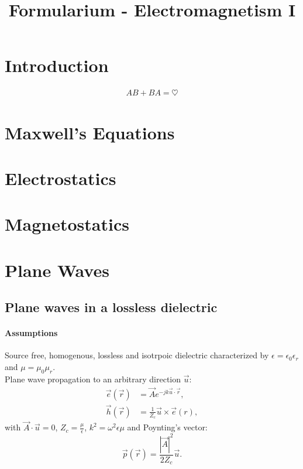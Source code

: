 \documentclass[a4paper, 10pt]{article}
\title{Formularium - Electromagnetism I}
\author{}
\date{}
\begin{document}
    
    \maketitle

    \section{Introduction}
    \begin{align}
        AB + BA = \heartsuit
    \end{align}
    \section{Maxwell's Equations}
    \section{Electrostatics}
    \section{Magnetostatics}
    \section{Plane Waves}
    \subsection{Plane waves in a lossless dielectric}
    \paragraph{Assumptions}
    Source free, homogenous, lossless and isotrpoic dielectric characterized by $\epsilon=\epsilon_0\epsilon_r$ and $\mu=\mu_0\mu_r$.\\
    Plane wave propagation to an arbitrary direction $\vec{u}$:
    \begin{align}
        \vec{e}(\vec{r}) & = \vec{A}e^{-jk\vec{u}\cdot \vec{r}} \label{PW_eq1},\\
        \vec{h}(\vec{r}) & = \frac{1}{Z_c}\vec{u}\times \vec{e}(r) \label{PW_eq2},
    \end{align}
    with $\vec{A}\cdot \vec{u} = 0$, $Z_c = \frac{\mu}{\epsilon}$, $k^2=\omega^2\epsilon\mu$ and Poynting's vector: 
    \begin{equation}\vec{p}(\vec{r})=\frac{|\vec{A}|^2}{2Z_c}\vec{u}.\label{PW_eq3}\end{equation}
\end{document}
